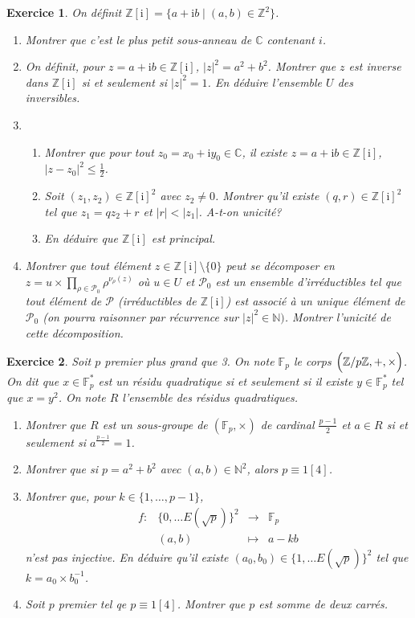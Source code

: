 \documentclass[12pt]{article}
\newtheorem{exercise}{Exercice}[section]
\theoremstyle{remark}
\theoremstyle{remark}
\newcommand{\C}{\mathbb{C}} \newcommand{\Q}{\mathbb{Q}}
\newcommand{\N}{\mathbb{N}} \newcommand{\Z}{\mathbb{Z}}
\newcommand{\function}[5]{
	$$
	\begin{array}{rccl}
		#1: & #2 & \to & #3 \\
		& #4 & \mapsto & #5
	\end{array}
	$$
}
\begin{document}
\begin{exercise}
	On définit $\Z[\mathrm{i}]=\{a+\mathrm{i}b\mid(a,b)\in\Z^{2}\}$.
	\begin{enumerate}
		\item
		Montrer que c'est le plus petit sous-anneau de $\C$ contenant $i$.
		\item
		On définit, pour $z=a+\mathrm{i}b\in\Z[\mathrm{i}]$, $\vert
		z\vert^{2}=a^{2}+b^{2}$. Montrer que $z$ est inverse dans $\Z[\mathrm{i}]$
		si et seulement si $\vert z\vert^{2}=1$. En déduire l'ensemble $U$ des
		inversibles.
		\item
		\begin{enumerate}
					\item
					Montrer que pour tout $z_{0}=x_{0}+\mathrm{i}y_{0}\in\C$, il
					existe $z=a+\mathrm{i}b\in\Z[\mathrm{i}]$, $\vert
					z-z_{0}\vert^{2}\leqslant\frac{1}{2}$.
					\item
					Soit $(z_{1},z_{2})\in\Z[\mathrm{i}]^{2}$ avec $z_{2}\neq 0$.
					Montrer qu'il existe $(q,r)\in\Z[\mathrm{i}]^{2}$ tel que
					$z_{1}=qz_{2}+r$ et $\vert r\vert<\vert z_{1}\vert$. A-t-on
					unicité?
					\item
					En déduire que $\Z[\mathrm{i}]$ est principal.
				\end{enumerate}
		\item
		Montrer que tout élément $z\in\Z[\mathrm{i}]\setminus\{0\}$ peut se
		décomposer en
		$z=u\times\prod_{\rho\in\mathcal{P}_{0}}\rho^{\nu_{\rho}(z)}$ où $u\in U$
		et $\mathcal{P}_{0}$ est un ensemble d'irréductibles tel que tout élément
		de $\mathcal{P}$ (irréductibles de $\Z[\mathrm{i}]$) est associé à un
		unique élément de $\mathcal{P}_{0}$ (on pourra raisonner par récurrence
		sur $\vert z\vert^{2}\in\N)$. Montrer l'unicité de cette décomposition.
	\end{enumerate}
\end{exercise}

\begin{exercise}
	Soit $p$ premier plus grand que 3. On note $\mathbb{F}_{p}$ le corps
	$\Bigl(\Z/p\Z,+,\times\Bigr)$. On dit que $x\in\mathbb{F}_{p}^{*}$ est un
	résidu quadratique si et seulement si il existe $y\in\mathbb{F}_{p}^{*}$ tel
	que $x=y^{2}$. On note $R$ l'ensemble des résidus quadratiques.
	\begin{enumerate}
		\item
		Montrer que $R$ est un sous-groupe de $(\mathbb{F}_{p},\times)$ de
		cardinal $\frac{p-1}{2}$ et $a\in R$ si et seulement si
		$a^{\frac{p-1}{2}}=1$.
		\item
		Montrer que si $p=a^{2}+b^{2}$ avec $(a,b)\in\N^{2}$, alors $p\equiv
		1[4]$.
		\item
		Montrer que, pour $k\in\{1,\dots,p-1\}$, \function{f}{\{0,\dots
		E(\sqrt{p})\}^{2}}{\mathbb{F}_p}{(a,b)}{a-kb} n'est pas injective. En
		déduire qu'il existe $(a_{0},b_{0})\in\{1,\dots E(\sqrt{p})\}^{2}$ tel que
		$k=a_{0}\times b_{0}^{-1}$.
		\item
		Soit $p$ premier tel qe $p\equiv 1[4]$. Montrer que $p$ est somme de deux
		carrés.
	\end{enumerate}
\end{exercise}
\end{document}
